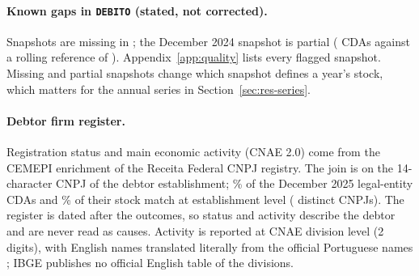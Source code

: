 \paragraph{Known gaps in \texttt{DEBITO} (stated, not corrected).}
Snapshots are missing in \qualMissingSnapshots; the December 2024 snapshot is partial (\qualDecTwentyFourCdas{} CDAs against a rolling reference of \qualDecTwentyFourRef).
Appendix~\ref{app:quality} lists every flagged snapshot.
Missing and partial snapshots change which snapshot defines a year's stock, which matters for the annual series in Section~\ref{sec:res-series}.

\paragraph{Debtor firm register.}
Registration status and main economic activity (CNAE 2.0) come from the CEMEPI enrichment of the Receita Federal CNPJ registry.
The join is on the 14-character CNPJ of the debtor establishment; \firmCovCdaDec\% of the December 2025 legal-entity CDAs and \firmCovStockDec\% of their stock match at establishment level (\firmNCnpjDec{} distinct CNPJs).
The register is dated after the outcomes, so status and activity describe the debtor and are never read as causes.
Activity is reported at CNAE division level (2 digits), with English names translated literally from the official Portuguese names \citep{ibge2015cnae}; IBGE publishes no official English table of the divisions.
